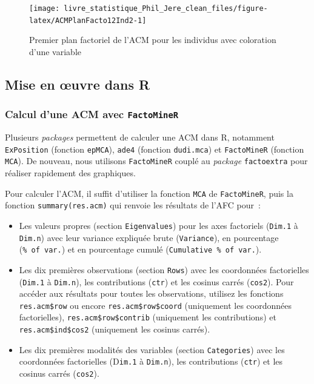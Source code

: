 \documentclass[
  11pt,
  french,
]{book}
\providecommand{\tightlist}{%
  \setlength{\itemsep}{0pt}\setlength{\parskip}{0pt}}
\begin{document}
\begin{figure}

{\centering \texttt{[image: livre\_statistique\_Phil\_Jere\_clean\_files/figure-latex/ACMPlanFacto12Ind2-1]} 

}

\caption{Premier plan factoriel de l'ACM pour les individus avec coloration d'une variable}\label{fig:ACMPlanFacto12Ind2}
\end{figure}

\hypertarget{sect1242}{%
\subsection{Mise en œuvre dans R}\label{sect1242}}

\hypertarget{sect12421}{%
\subsubsection{\texorpdfstring{Calcul d'une ACM avec \texttt{FactoMineR}}{Calcul d'une ACM avec FactoMineR}}\label{sect12421}}

Plusieurs \emph{packages} permettent de calculer une ACM dans R, notamment \texttt{ExPosition} (fonction \texttt{epMCA}), \texttt{ade4} (fonction \texttt{dudi.mca}) et \texttt{FactoMineR} (fonction \texttt{MCA}). De nouveau, nous utilisons \texttt{FactoMineR} couplé au \emph{package} \texttt{factoextra} pour réaliser rapidement des graphiques.

Pour calculer l'ACM, il suffit d'utiliser la fonction \texttt{MCA} de \texttt{FactoMineR}, puis la fonction \texttt{summary(res.acm)} qui renvoie les résultats de l'AFC pour~:

\begin{itemize}
\tightlist
\item
  Les valeurs propres (section \texttt{Eigenvalues}) pour les axes factoriels (\texttt{Dim.1} à \texttt{Dim.n}) avec leur variance expliquée brute (\texttt{Variance}), en pourcentage (\texttt{\%\ of\ var.}) et en pourcentage cumulé (\texttt{Cumulative\ \%\ of\ var.}).
\item
  Les dix premières observations (section \texttt{Rows}) avec les coordonnées factorielles (\texttt{Dim.1} à \texttt{Dim.n}), les contributions (\texttt{ctr}) et les cosinus carrés (\texttt{cos2}). Pour accéder aux résultats pour toutes les observations, utilisez les fonctions \texttt{res.acm\$row} ou encore \texttt{res.acm\$row\$coord} (uniquement les coordonnées factorielles), \texttt{res.acm\$row\$contrib} (uniquement les contributions) et \texttt{res.acm\$ind\$cos2} (uniquement les cosinus carrés).
\item
  Les dix premières modalités des variables (section \texttt{Categories}) avec les coordonnées factorielles (D\texttt{im.1} à \texttt{Dim.n}), les contributions (\texttt{ctr}) et les cosinus carrés (\texttt{cos2}).
\end{itemize}
\end{document}
